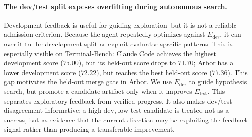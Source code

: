 \documentclass[]{selfevolagent}
\theoremstyle{plain}
\theoremstyle{definition}
\theoremstyle{remark}
\begin{document}
\paragraph{The dev/test split exposes overfitting during autonomous search.}
Development feedback is useful for guiding exploration, but it is not a reliable admission criterion. Because the agent repeatedly optimizes against $E_{\mathrm{dev}}$, it can overfit to the development split or exploit evaluator-specific patterns. This is especially visible on Terminal-Bench: Claude Code achieves the highest development score ($75.00$), but its held-out score drops to $71.70$; Arbor has a lower development score ($72.22$), but reaches the best held-out score ($77.36$).
This gap motivates the held-out merge gate in Arbor. We use $E_{\mathrm{dev}}$ to guide hypothesis search, but promote a candidate artifact only when it improves $E_{\mathrm{test}}$. This separates exploratory feedback from verified progress. It also makes dev/test disagreement informative: a high-dev, low-test candidate is treated not as a success, but as evidence that the current direction may be exploiting the feedback signal rather than producing a transferable improvement.
\end{document}
